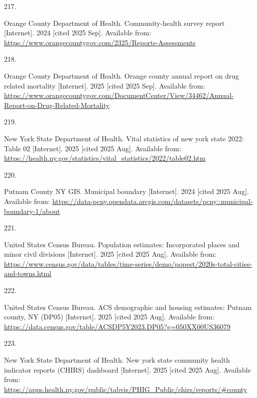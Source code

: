 \documentclass[
  english,
  letterpaper,
]{report}
\newlength{\cslhangindent}
\newlength{\csllabelwidth}
\newenvironment{CSLReferences}[2] %
 {\begin{list}{}{%
  \setlength{\itemindent}{0pt}
  \setlength{\leftmargin}{0pt}
  \setlength{\parsep}{0pt}
  \ifodd #1
   \setlength{\leftmargin}{\cslhangindent}
   \setlength{\itemindent}{-1\cslhangindent}
  \fi
  \setlength{\itemsep}{#2\baselineskip}}}
 {\end{list}}
\newcommand{\CSLLeftMargin}[1]{\parbox[t]{\csllabelwidth}{\strut#1\strut}}
\newcommand{\CSLRightInline}[1]{\parbox[t]{\linewidth - \csllabelwidth}{\strut#1\strut}}
\begin{document}
\begin{CSLReferences}{0}{1}
\CSLLeftMargin{217. }%
\CSLRightInline{Orange County Department of Health. Community-health
survey report {[}Internet{]}. 2024 {[}cited 2025 Sep{]}. Available from:
\url{https://www.orangecountygov.com/2325/Reports-Assessments}}

\CSLLeftMargin{218. }%
\CSLRightInline{Orange County Department of Health. Orange county annual
report on drug related mortality {[}Internet{]}. 2025 {[}cited 2025
Sep{]}. Available from:
\url{https://www.orangecountygov.com/DocumentCenter/View/34462/Annual-Report-on-Drug-Related-Mortality}}

\CSLLeftMargin{219. }%
\CSLRightInline{New York State Department of Health. Vital statistics of
new york state 2022: Table 02 {[}Internet{]}. 2025 {[}cited 2025 Aug{]}.
Available from:
\url{https://health.ny.gov/statistics/vital_statistics/2022/table02.htm}}

\CSLLeftMargin{220. }%
\CSLRightInline{Putnam County NY GIS. Municipal boundary {[}Internet{]}.
2024 {[}cited 2025 Aug{]}. Available from:
\url{https://data-pcny.opendata.arcgis.com/datasets/pcny::municipal-boundary-1/about}}

\CSLLeftMargin{221. }%
\CSLRightInline{United States Census Bureau. Population estimates:
Incorporated places and minor civil divisions {[}Internet{]}. 2025
{[}cited 2025 Aug{]}. Available from:
\url{https://www.census.gov/data/tables/time-series/demo/popest/2020s-total-cities-and-towns.html}}

\CSLLeftMargin{222. }%
\CSLRightInline{United States Census Bureau. ACS demographic and housing
estimates: Putnam county, NY (DP05) {[}Internet{]}. 2025 {[}cited 2025
Aug{]}. Available from:
\url{https://data.census.gov/table/ACSDP5Y2023.DP05?g=050XX00US36079}}

\CSLLeftMargin{223. }%
\CSLRightInline{New York State Department of Health. New york state
community health indicator reports (CHIRS) dashboard {[}Internet{]}.
2025 {[}cited 2025 Aug{]}. Available from:
\url{https://apps.health.ny.gov/public/tabvis/PHIG_Public/chirs/reports/\#county}}


\end{CSLReferences}
\end{document}
